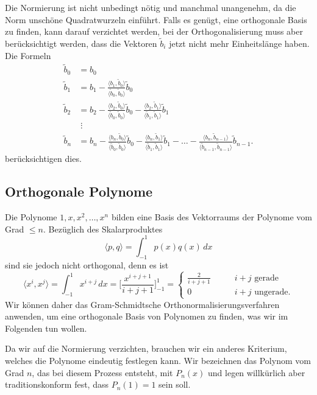 Die Normierung ist nicht unbedingt nötig und manchmal unangenehm,
da die Norm unschöne Quadratwurzeln einführt.
Falls es genügt, eine orthogonale Basis zu finden, kann darauf
verzichtet werden, bei der Orthogonalisierung muss aber berücksichtigt
werden, dass die Vektoren $\tilde{b}_i$ jetzt nicht mehr Einheitslänge
haben.
Die Formeln
\begin{align*}
\tilde{b}_0
&=
b_0
\\
\tilde{b}_1
&=
b_1
-
\frac{\langle b_1,\tilde{b}_0\rangle}{\langle \tilde{b}_0,\tilde{b}_0\rangle}\tilde{b}_0
\\
\tilde{b}_2
&=
b_2
-
\frac{\langle b_2,\tilde{b}_0\rangle}{\langle \tilde{b}_0,\tilde{b}_0\rangle}\tilde{b}_0
-
\frac{\langle b_2,\tilde{b}_1\rangle}{\langle \tilde{b}_1,\tilde{b}_1\rangle}\tilde{b}_1
\\
&\;\vdots
\\
\tilde{b}_n
&=
b_n
-
\frac{\langle b_n,\tilde{b}_0\rangle}{\langle \tilde{b}_0,\tilde{b}_0\rangle}\tilde{b}_0
-
\frac{\langle b_n,\tilde{b}_1\rangle}{\langle \tilde{b}_1,\tilde{b}_1\rangle}\tilde{b}_1
-
\dots
-
\frac{\langle b_n,\tilde{b}_{n-1}\rangle}{\langle \tilde{b}_{n-1},\tilde{b}_{n-1}\rangle}\tilde{b}_{n-1}.
\end{align*}
berücksichtigen dies.


%
%
\subsection{Orthogonale Polynome
\label{buch:integral:subsection:orthogonale-polynome}}
Die Polynome $1,x,x^2,\dots,x^n$ bilden eine Basis des Vektorraums
der Polynome vom Grad $\le n$.
Bezüglich des Skalarproduktes
\[
\langle p,q\rangle
=
\int_{-1}^1 p(x)q(x)\,dx
\]
sind sie jedoch nicht orthogonal, denn es ist
\[
\langle x^i,x^j\rangle
=
\int_{-1}^1 x^{i+j}\,dx
=
\biggl[\frac{x^{i+j+1}}{i+j+1}\biggr]_{-1}^1
=
\begin{cases}
\frac{2}{i+j+1}&\qquad\text{$i+j$ gerade}\\
              0&\qquad\text{$i+j$ ungerade}.
\end{cases}
\]
Wir können daher das Gram-Schmidtsche Orthonormalisierungsverfahren
anwenden, um eine orthogonale Basis von Polynomen zu finden, was
wir im Folgenden tun wollen.


Da wir auf die Normierung verzichten, brauchen wir ein anderes
Kriterium, welches die Polynome eindeutig festlegen kann.
Wir bezeichnen das Polynom vom Grad $n$, das bei diesem Prozess
entsteht, mit $P_n(x)$ und legen willkürlich aber traditionskonform
fest, dass $P_n(1)=1$ sein soll.

